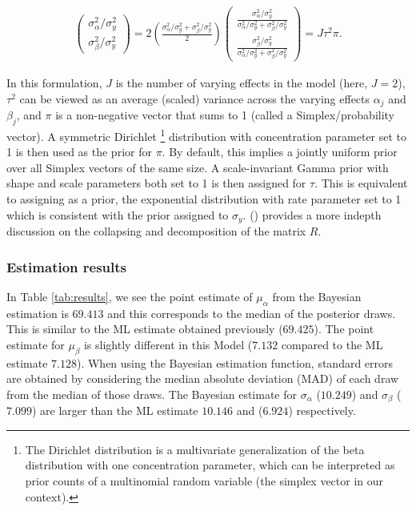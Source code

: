 \begin{align}
	\left(\begin{matrix}
		\sigma_\alpha^2/\sigma_y^2 \\
		\sigma_\beta^2/\sigma_y^2
	\end{matrix} \right) =
	2\left(\frac{\sigma_\alpha^2/\sigma_y^2 + \sigma_\beta^2/\sigma_y^2}{2}\right)\left(\begin{matrix}
		\frac{\sigma_\alpha^2/\sigma_y^2}{\sigma_\alpha^2/\sigma_y^2 + \sigma_\beta^2/\sigma_y^2} \\
		\frac{\sigma_\beta^2/\sigma_y^2}{\sigma_\alpha^2/\sigma_y^2 + \sigma_\beta^2/\sigma_y^2}
	\end{matrix} \right)=
	J\tau^2 \pi.
\end{align}



In this formulation, $J$ is the number of varying effects in the model (here, $J=2$), $\tau^2$ can be viewed as an average (scaled) variance across the varying effects $\alpha_j$ and $\beta_j$, and $\pi$ is a non-negative vector that sums to 1 (called a Simplex/probability vector).  A symmetric Dirichlet \footnote{The Dirichlet distribution is a multivariate generalization of the beta distribution with one concentration parameter, which can be interpreted as prior counts of a multinomial random variable (the simplex vector in our context).} distribution with concentration parameter set to 1 is then used as the prior for $\pi$.  By default, this implies a jointly uniform prior over all Simplex vectors of the same size.  A scale-invariant Gamma prior with shape and scale parameters both set to 1 is then assigned for $\tau$.  This is equivalent to assigning as a prior, the exponential distribution with rate parameter set to 1 which is consistent with the prior assigned to $\sigma_y$. (\cite{lewandowski2009generating}) provides a more indepth discussion on the collapsing and decomposition of the matrix $R$.

\subsubsection*{Estimation results}
In Table \ref{tab:results}, we see the point estimate of $\mu_{\alpha}$ from the Bayesian estimation is $69.413$ and this corresponds to the median of the posterior draws.  This is similar to the ML estimate obtained previously ($69.425$).  The point estimate for $\mu_{\beta}$  is slightly different in this Model ($7.132$ compared to the ML estimate $7.128$). When using the Bayesian estimation function, standard errors are obtained by considering the median absolute deviation (MAD) of each draw from the median of those draws.  The Bayesian estimate for $\sigma_{\alpha}$ ($10.249$) and $\sigma_{\beta}$ ($7.099$) are larger than the ML estimate $10.146$ and ($6.924$) respectively. 

